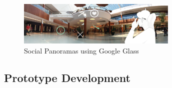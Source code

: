 


\begin{figure}[ht]
	\centering
	\includegraphics[width=3in]{images/ismar14/concept}
	\caption{Social Panoramas using Google Glass}
	\label{fig:ismar14:concept}
\end{figure}

\subsection{Prototype Development}

